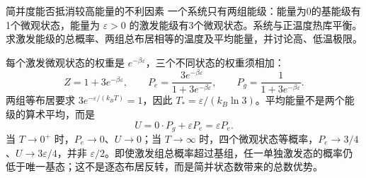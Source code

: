 \begin{origexamplebox}{简并度能否抵消较高能量的不利因素}\label{ch18:ex:teaching-degeneracy}
一个系统只有两组能级：能量为0的基能级有1个微观状态，能量为 $\varepsilon>0$ 的激发能级有3个微观状态。系统与正温度热库平衡。求激发能级的总概率、两组总布居相等的温度及平均能量，并讨论高、低温极限。
\end{origexamplebox}
\begin{xesolution}
每个激发微观状态的权重是 $e^{-\beta\varepsilon}$，三个不同状态的权重须相加：
\[
 Z=1+3e^{-\beta\varepsilon},\qquad
 P_e=\frac{3e^{-\beta\varepsilon}}{1+3e^{-\beta\varepsilon}},\qquad
 P_g=\frac1{1+3e^{-\beta\varepsilon}}.
\]
两组等布居要求 $3e^{-\varepsilon/(k_BT)}=1$，因此 $T_*=\varepsilon/(k_B\ln3)$。平均能量不是两个能级的算术平均，而是
\[
 U=0\cdot P_g+\varepsilon P_e=\varepsilon P_e.
\]
当 $T\to0^+$ 时，$P_e\to0$、$U\to0$；当 $T\to\infty$ 时，四个微观状态等概率，$P_e\to3/4$、$U\to3\varepsilon/4$，并非 $\varepsilon/2$。即使激发组总概率超过基组，任一单独激发态的概率仍低于唯一基态；这不是逐态布居反转，而是简并状态数带来的总数优势。
\end{xesolution}
